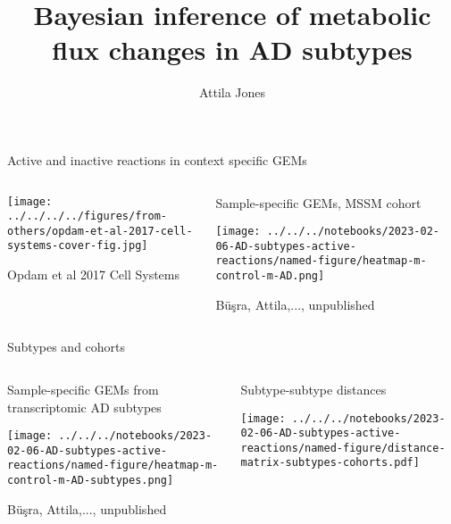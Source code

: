\documentclass[aspectratio=169]{beamer}
\title{Bayesian inference of metabolic flux changes in AD subtypes}
\subtitle{}
\author{Attila Jones}
\date{}
\begin{document}
\titlepage


\begin{frame}{Active and inactive reactions in context specific GEMs} 
\begin{columns}[t]
\begin{column}{0.5\textwidth}

\texttt{[image: ../../../../figures/from-others/opdam-et-al-2017-cell-systems-cover-fig.jpg]}

{\tiny Opdam et al 2017 Cell Systems}
\end{column}

\begin{column}{0.5\textwidth}
Sample-specific GEMs, MSSM cohort

\texttt{[image: ../../../notebooks/2023-02-06-AD-subtypes-active-reactions/named-figure/heatmap-m-control-m-AD.png]}

{\tiny B\"{u}\c{s}ra, Attila,..., unpublished}
\end{column}
\end{columns}
\end{frame}

\begin{frame}{Subtypes and cohorts}
\begin{columns}[t]
\begin{column}{0.5\textwidth}
Sample-specific GEMs from transcriptomic AD subtypes

\texttt{[image: ../../../notebooks/2023-02-06-AD-subtypes-active-reactions/named-figure/heatmap-m-control-m-AD-subtypes.png]}

{\tiny B\"{u}\c{s}ra, Attila,..., unpublished}
\end{column}

\begin{column}{0.5\textwidth}
  Subtype-subtype distances

\texttt{[image: ../../../notebooks/2023-02-06-AD-subtypes-active-reactions/named-figure/distance-matrix-subtypes-cohorts.pdf]}
\end{column}
\end{columns}
\end{frame}
\end{document}
